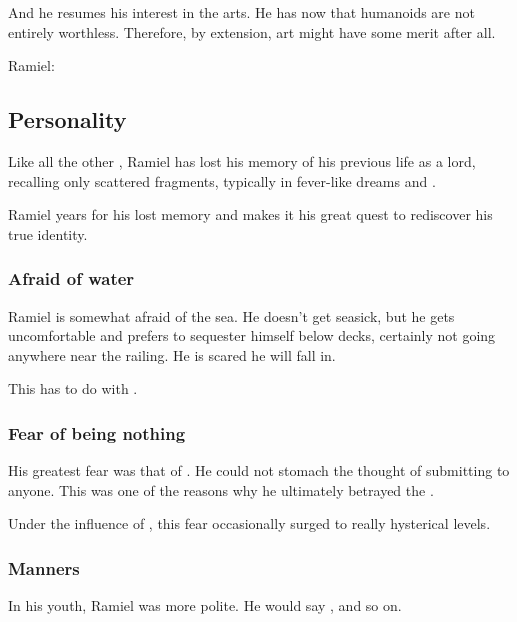 And he resumes his interest in the arts. 
He has now  that humanoids are not entirely worthless. 
Therefore, by extension, art might have some merit after all. 

Ramiel: 










\subsection{Personality}
Like all the other \Malachim, Ramiel has lost his memory of his previous life as a \resphan{} lord, recalling only scattered fragments, typically in fever-like dreams and \deajvus. 

Ramiel years for his lost memory and makes it his great quest to rediscover his true identity.





\subsubsection{Afraid of water}
Ramiel is somewhat afraid of the sea. 
He doesn't get seasick, but he gets uncomfortable and prefers to sequester himself below decks, certainly not going anywhere near the railing. 
He is scared he will fall in. 

This has to do with . 





\subsubsection{Fear of being nothing}
His greatest fear was that of . 
He could not stomach the thought of submitting to anyone. 
This was one of the reasons why he ultimately betrayed the \banelords. 

Under the influence of , this fear occasionally surged to really hysterical levels. 





\subsubsection{Manners}
In his youth, Ramiel was more polite. 
He would say ,  and so on. 

